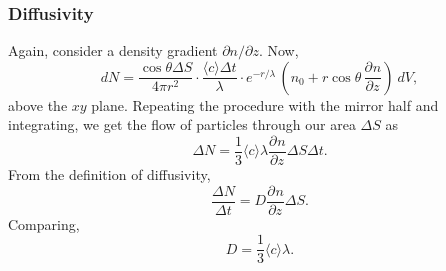 \documentclass[11pt]{article}
\newcommand\pp[3][]{\frac{\partial^{#1}{#2}}{\partial {#3}^{#1}}}
\newcommand\E[1]{\langle #1 \rangle}
\theoremstyle{definition}
\theoremstyle{remark}
\numberwithin{equation}{section}
\begin{document}
    \subsubsection{Diffusivity}
    Again, consider a density gradient $\partial n / \partial z$. Now, \[
        dN = \frac{\cos\theta \Delta S}{4\pi r^2}\cdot \frac{\E{c}\Delta
        t}{\lambda}\cdot e^{-r / \lambda}\,\left(n_0 +
        r\cos\theta\,\pp{n}{z}\right)\:dV,
    \] above the $xy$ plane. Repeating the procedure with the mirror half and
    integrating, we get the flow of particles through our area $\Delta S$ as \[
        \Delta N = \frac{1}{3}\E{c}\lambda \pp{n}{z}\Delta S \Delta t.
    \] From the definition of diffusivity, \[
        \frac{\Delta N}{\Delta t} = D \pp{n}{z}\Delta S.
    \] Comparing, \[
        D = \frac{1}{3}\E{c}\lambda.
    \] 
\end{document}
